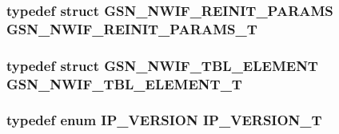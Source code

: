 \hypertarget{a00534_abe5b22bf98ced0df6c6eb1abfc0230c1}{
\subsubsection[{GSN\_\-NWIF\_\-REINIT\_\-PARAMS\_\-T}]{\setlength{\rightskip}{0pt plus 5cm}typedef struct {\bf GSN\_\-NWIF\_\-REINIT\_\-PARAMS} {\bf GSN\_\-NWIF\_\-REINIT\_\-PARAMS\_\-T}}}
\label{a00534_abe5b22bf98ced0df6c6eb1abfc0230c1}
\hypertarget{a00534_a8a45953bae7352132d28cdd008cf0968}{
\subsubsection[{GSN\_\-NWIF\_\-TBL\_\-ELEMENT\_\-T}]{\setlength{\rightskip}{0pt plus 5cm}typedef struct {\bf GSN\_\-NWIF\_\-TBL\_\-ELEMENT} {\bf GSN\_\-NWIF\_\-TBL\_\-ELEMENT\_\-T}}}
\label{a00534_a8a45953bae7352132d28cdd008cf0968}
\hypertarget{a00534_af2db652f956f3af146d479868ef42d8f}{
\subsubsection[{IP\_\-VERSION\_\-T}]{\setlength{\rightskip}{0pt plus 5cm}typedef enum {\bf IP\_\-VERSION} {\bf IP\_\-VERSION\_\-T}}}
\label{a00534_af2db652f956f3af146d479868ef42d8f}


